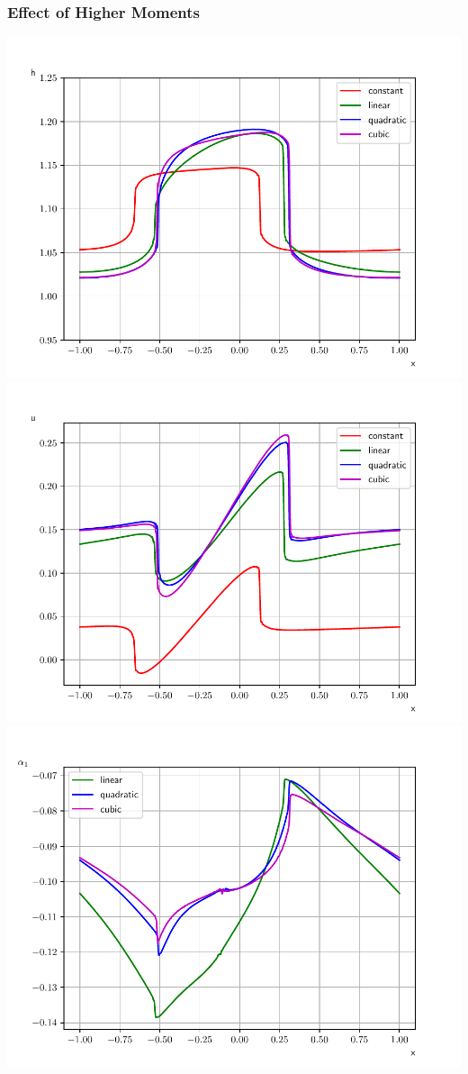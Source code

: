 \documentclass[10pt]{beamer}
\begin{document}
    \begin{frame}
        \frametitle{Effect of Higher Moments}
        \centering
        \includegraphics[scale=0.29]{Figures/height_torillhon.pdf}
        \includegraphics[scale=0.29]{Figures/mean_velocity_torrilhon.pdf}
        \includegraphics[scale=0.29]{Figures/alpha_1_torrilhon.pdf}

\end{frame}
\end{document}
